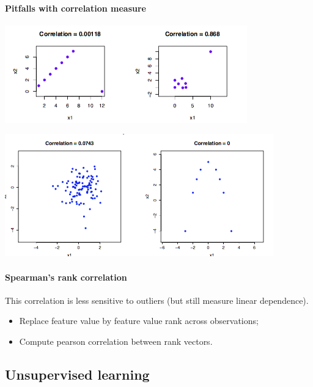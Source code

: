 \paragraph{Pitfalls with correlation measure}

\begin{center}
	\includegraphics[scale=0.6]{images/53_outliers.png}
\end{center}

\begin{center}
	\includegraphics[scale=0.4]{images/54_linear.png}
\end{center}


\paragraph{Spearman's rank correlation}

This correlation is less sensitive to outliers (but still measure linear dependence).
\begin{itemize}
	\item Replace feature value by feature value rank across observations;
	\item Compute pearson correlation between rank vectors.
\end{itemize}

\subsection{Unsupervised learning}

